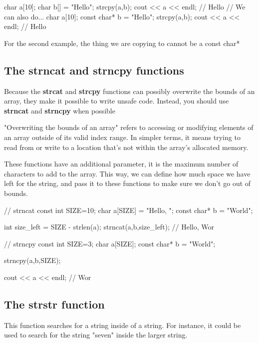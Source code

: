 \documentclass{report}
\begin{document}
    \begin{cppcode}
char a[10];
char b[] = "Hello";
strcpy(a,b);
cout << a << endl; // Hello
// We can also do...
char a[10];
const char* b = "Hello";
strcpy(a,b);
cout << a << endl; // Hello
    \end{cppcode}
    
    \bigbreak \noindent 
    \begin{notebox}
			For the second example, the thing we are copying to cannot be a const char*
		\end{notebox}
    \bigbreak \noindent 

    \pagebreak \bigbreak \noindent 
    \subsection{The strncat and strncpy functions}
    \bigbreak \noindent 
    Because the \textbf{strcat} and \textbf{strcpy} functions can possibly overwrite the bounds of an array, they make it possible to write unsafe code. Instead, you should use \textbf{strncat} and \textbf{strncpy} when possible
    \bigbreak \noindent 
    \begin{remark}
       "Overwriting the bounds of an array" refers to accessing or modifying elements of an array outside of its valid index range. In simpler terms, it means trying to read from or write to a location that's not within the array's allocated memory.
    \end{remark}
    \bigbreak \noindent 
    These functions have an additional parameter, it is the maximum number of characters to add to the array. This way, we can define how much space we have left for the string, and pass it to these functions to make sure we don't go out of bounds.
    \bigbreak \noindent 
    
    \begin{cppcode}
// strncat
const int SIZE=10;
char a[SIZE] = "Hello, ";
const char* b = "World";

int size_left = SIZE - strlen(a);
strncat(a,b,size_left); // Hello, Wor

// strncpy
const int SIZE=3;
char a[SIZE];
const char* b = "World";

strncpy(a,b,SIZE);

cout << a << endl; // Wor
    \end{cppcode}
    

    \bigbreak \noindent 
    \subsection{The strstr function}
    \bigbreak \noindent 
    This function searches for a string inside of a string. For instance, it could be used to search for the string "seven" inside the larger string.
    \bigbreak \noindent 
    
\end{document}
